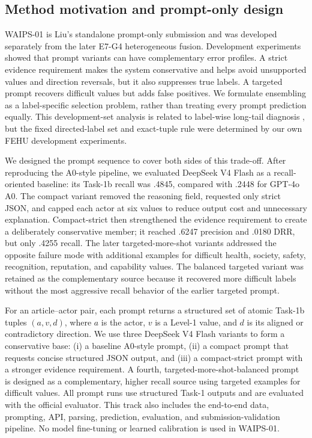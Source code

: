 \documentclass[sigconf,article,a4paper]{acmart}
\begin{document}

\subsection{Method motivation and prompt-only design}

WAIPS-01 is Liu's standalone prompt-only submission and was developed
separately from the later E7-G4 heterogeneous fusion. Development experiments
showed that prompt variants can have complementary error profiles. A strict
evidence requirement makes the system conservative and helps avoid unsupported
values and direction reversals, but it also suppresses
true labels. A targeted prompt recovers difficult values but adds
false positives. We formulate ensembling as a label-specific
selection problem, rather than treating every prompt prediction equally. This
development-set analysis is related to label-wise long-tail diagnosis
\cite{cui2019,menon2021}, but the fixed directed-label set and exact-tuple rule
were determined by our own FEHU development experiments.

We designed the prompt sequence to cover both sides of this trade-off. After
reproducing the A0-style pipeline, we evaluated DeepSeek V4 Flash as a
recall-oriented baseline: its Task-1b recall was .4845, compared
with .2448 for GPT-4o A0. The compact variant removed the reasoning field,
requested only strict JSON, and capped each actor at six values to reduce output
cost and unnecessary explanation. Compact-strict then strengthened the evidence
requirement to create a deliberately conservative member; it reached .6247
precision and .0180 DRR, but only .4255 recall. The later targeted-more-shot
variants addressed the opposite failure mode with additional examples for
difficult health, society, safety, recognition, reputation, and capability
values. The balanced targeted variant was retained as the complementary source
because it recovered more difficult labels without the most aggressive recall
behavior of the earlier targeted prompt.

For an article--actor pair, each prompt returns a structured set of atomic
Task-1b tuples $(a,v,d)$, where $a$ is the actor, $v$ is a Level-1 value, and
$d$ is its aligned or contradictory direction. We use three DeepSeek V4 Flash
variants to form a conservative base: (i) a baseline A0-style prompt, (ii) a
compact prompt that requests concise structured JSON output, and (iii) a
compact-strict prompt with a stronger evidence requirement. A fourth,
targeted-more-shot-balanced prompt is designed as a complementary, higher
recall source using targeted examples for difficult values. All prompt runs
use structured Task-1 outputs and are evaluated with the official evaluator.
This track also includes the end-to-end data, prompting, API, parsing,
prediction, evaluation, and submission-validation pipeline. No model
fine-tuning or learned calibration is used in WAIPS-01.
\end{document}
